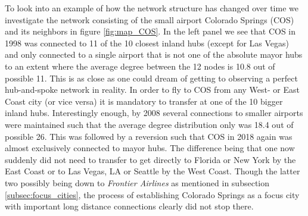 To look into an example of how the network structure has changed over time we investigate the network consisting of the small airport Colorado Springs (COS) and its neighbors in figure \ref{fig:map_COS}. In the left panel we see that COS in 1998 was connected to 11 of the 10 closest inland hubs (except for Las Vegas) and only connected to a single airport that is not one of the absolute mayor hubs to an extent where the average degree between the 12 nodes is 10.8 out of possible 11. This is as close as one could dream of getting to observing a perfect hub-and-spoke network in reality. In order to fly to COS from any West- or East Coast city (or vice versa) it is mandatory to transfer at one of the 10 bigger inland hubs. Interestingly enough, by 2008 several connections to smaller airports were maintained such that the average degree distribution only was 18.4 out of possible 26. This was followed by a reversion such that COS in 2018 again was almost exclusively connected to mayor hubs. The difference being that one now suddenly did not need to transfer to get directly to Florida or New York by the East Coast or to Las Vegas, LA or Seattle by the West Coast. Though the latter two possibly being down to \textit{Frontier Airlines} as mentioned in subsection \ref{subsec:focus_cities}, the process of establishing Colorado Springs as a focus city with important long distance connections clearly did not stop there.
